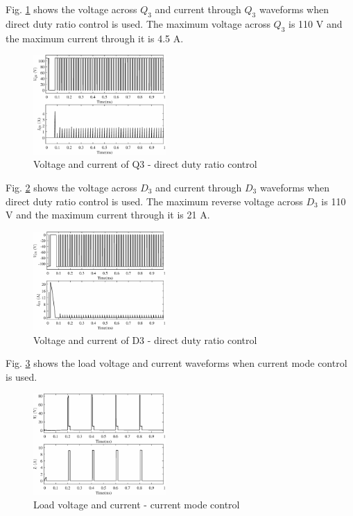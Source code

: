 \documentclass[a4paper]{IEEEtran}
\begin{document}
	Fig. \ref{fig:sim-q3} shows the voltage across $Q_3$ and current through $Q_3$ waveforms when direct duty ratio control is used. The maximum voltage across $Q_3$ is 110 V and the maximum current through it is 4.5 A. 

	\begin{figure}
		\centering
		\includegraphics[width=0.45\textwidth]{Q3}
		\caption{Voltage and current of Q3 - direct duty ratio control}
		\label{fig:sim-q3}
	\end{figure}

	Fig. \ref{fig:sim-d3} shows the voltage across $D_3$ and current through $D_3$ waveforms when direct duty ratio control is used. The maximum reverse voltage across $D_3$ is 110 V and the maximum current through it is 21 A.

	\begin{figure}
		\centering
		\includegraphics[width=0.45\textwidth]{D3}
		\caption{Voltage and current of D3 - direct duty ratio control}
		\label{fig:sim-d3}
	\end{figure}

	Fig. \ref{fig:sim-cmc} shows the load voltage and current waveforms when current mode control is used.

	\begin{figure}
		\centering
		\includegraphics[width=0.45\textwidth]{load_cmc}
		\caption{Load voltage and current - current mode control}
		\label{fig:sim-cmc}
	\end{figure}
\end{document}

